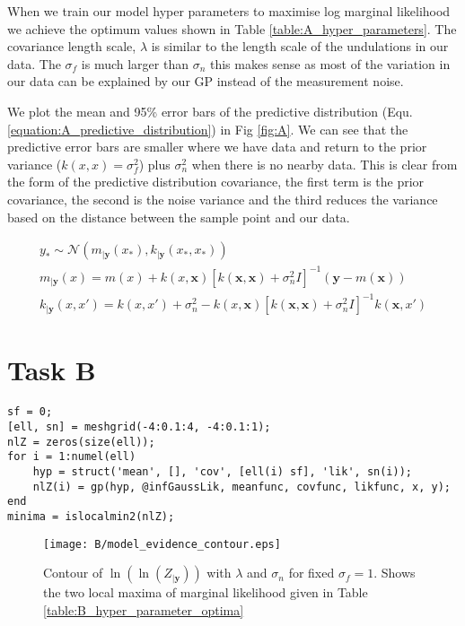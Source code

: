 \documentclass[11pt]{article}
\begin{document}
When we train our model hyper parameters to maximise log marginal likelihood we achieve the optimum values shown in Table \ref{table:A_hyper_parameters}. The covariance length scale, $\lambda$ is similar to the length scale of the undulations in our data. The $\sigma_f$ is much larger than $\sigma_n$ this makes sense as most of the variation in our data can be explained by our GP instead of the measurement noise.

We plot the mean and 95\% error bars of the predictive distribution (Equ.\ref{equation:A_predictive_distribution}) in Fig \ref{fig:A}. We can see that the predictive error bars are smaller where we have data and return to the prior variance ($k(x, x) = \sigma_f^2$) plus $\sigma_n^2$ when there is no nearby data. This is clear from the form of the predictive distribution covariance, the first term is the prior covariance, the second is the noise variance and the third reduces the variance based on the distance between the sample point and our data.

\begin{equation}
    \begin{gathered}
        y_* \sim \mathcal{N}(m_{|\textbf{y}}(x_*), k_{|\textbf{y}}(x_*, x_*)) \\
        m_{|\textbf{y}}(x) = m(x) + k(x, \textbf{x})[k(\textbf{x}, \textbf{x}) + \sigma_n^2 I]^{-1} (\textbf{y} - m(\textbf{x})) \\
        k_{|\textbf{y}}(x, x') = k(x, x') + \sigma_n^2 - k(x, \textbf{x})[k(\textbf{x}, \textbf{x}) + \sigma_n^2 I]^{-1} k(\textbf{x}, x')
    \end{gathered}
    \label{equation:A_predictive_distribution}
\end{equation}

\section{Task B}

\begin{lstlisting}[caption=Code to sweep $\lambda$ and $\sigma_n$ to identify local minima of $\log(Z_{|\textbf{y}})$, captionpos=b, basicstyle=\small]
sf = 0;
[ell, sn] = meshgrid(-4:0.1:4, -4:0.1:1);
nlZ = zeros(size(ell));
for i = 1:numel(ell)
    hyp = struct('mean', [], 'cov', [ell(i) sf], 'lik', sn(i));
    nlZ(i) = gp(hyp, @infGaussLik, meanfunc, covfunc, likfunc, x, y);
end
minima = islocalmin2(nlZ);
\end{lstlisting}

\begin{figure}[h]
    \centering
    \texttt{[image: B/model\_evidence\_contour.eps]}
    \caption{Contour of $\ln(\ln(Z_{|\textbf{y}}))$ with $\lambda$ and $\sigma_n$ for fixed $\sigma_f = 1$. Shows the two local maxima of marginal likelihood given in Table \ref{table:B_hyper_parameter_optima}}
    \label{fig:B_marginal_liklihood_contour}
\end{figure}
\end{document}
